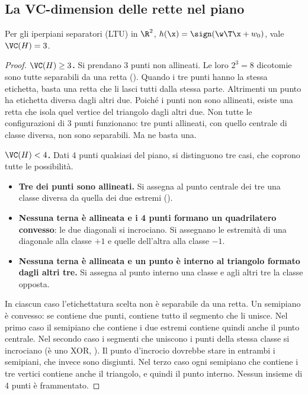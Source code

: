 \subsection{La VC-dimension delle rette nel piano}

\begin{teorema}
Per gli iperpiani separatori (LTU) in $\R^2$, $h(\x) = \sign(\w\T\x+w_0)$, vale $\VC(H) = 3$.
\end{teorema}
\begin{proof}
\textbf{$\VC(H)\ge3$.} Si prendano 3 punti non allineati. Le loro $2^3=8$ dicotomie sono tutte separabili da una
retta (). Quando i tre punti hanno la stessa etichetta, basta una retta che li lasci tutti
dalla stessa parte. Altrimenti un punto ha etichetta diversa dagli altri due. Poiché i punti non sono allineati,
esiste una retta che isola quel vertice del triangolo dagli altri due. Non tutte le configurazioni di 3 punti
funzionano: tre punti allineati, con quello centrale di classe diversa, non sono separabili. Ma ne basta una.

\textbf{$\VC(H)<4$.} Dati 4 punti qualsiasi del piano, si distinguono tre casi, che coprono tutte le
possibilità.
\begin{itemize}
  \item \textbf{Tre dei punti sono allineati.} Si assegna al punto centrale dei tre una classe diversa da quella
        dei due estremi ().
  \item \textbf{Nessuna terna è allineata e i 4 punti formano un quadrilatero convesso}: le due diagonali si
        incrociano. Si assegnano le estremità di una diagonale alla classe $+1$ e quelle dell'altra alla
        classe $-1$.
  \item \textbf{Nessuna terna è allineata e un punto è interno al triangolo formato dagli altri tre.} Si assegna
        al punto interno una classe e agli altri tre la classe opposta.
\end{itemize}
In ciascun caso l'etichettatura scelta non è separabile da una retta. Un semipiano è convesso: se contiene due
punti, contiene tutto il segmento che li unisce. Nel primo caso il semipiano che contiene i due estremi contiene
quindi anche il punto centrale. Nel secondo caso i segmenti che uniscono i punti della stessa classe si
incrociano (è uno XOR, ). Il punto d'incrocio dovrebbe stare in entrambi i semipiani,
che invece sono disgiunti. Nel terzo caso ogni semipiano che contiene i tre vertici contiene anche il triangolo, e
quindi il punto interno. Nessun insieme di 4 punti è frammentato.
\end{proof}

